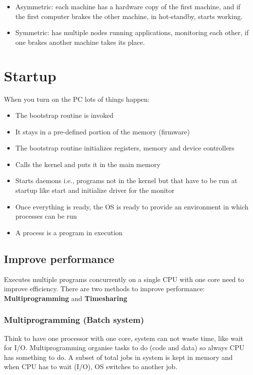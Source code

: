 \begin{itemize}
    \item Asymmetric: each machine has a hardware copy of the first machine, and if the first computer brakes the other machine, in hot-standby, starts working.
    \item Symmetric: has multiple nodes running applications, monitoring each other, if one brakes another machine takes its place.
\end{itemize}

\newpage

\section{Startup}
When you turn on the PC lots of things happen:

\begin{itemize}
    \item The bootstrap routine is invoked
    \item It stays in a pre-defined portion of the memory (firmware)
    \item The bootstrap routine initializes registers, memory and device controllers
    \item Calls the kernel and puts it in the main memory
    \item Starts daemons i.e., programs not in the kernel but that have to be run at startup like start and initialize driver for the monitor
    \item Once everything is ready, the OS is ready to provide an environment in which processes can be run
    \item A process is a program in execution
\end{itemize}

\subsection{Improve performance}


Executes multiple programs concurrently on a single CPU with one core need to improve efficiency.
There are two methods to improve performance: \textbf{Multiprogramming} and \textbf{Timesharing}


\subsubsection{Multiprogramming (Batch system)}

Think to have one processor with one core, system can not waste time, like wait for I/O. Multiprogramming organise tasks to do (code and data) so always CPU has something to do.
A subset of total jobs in system is kept in memory and when CPU has to wait (I/O), OS switches to another job.

